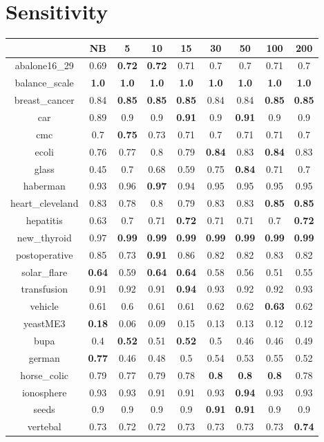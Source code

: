 \documentclass{article}%
\begin{document}
%
\section*{Sensitivity}%
\begin{tabular}{c|cccccccc}%
\hline%
&NB&5&10&15&30&50&100&200\\%
\hline%
abalone16\_29&0.69&\textbf{0.72}&\textbf{0.72}&0.71&0.7&0.7&0.71&0.7\\%
\hline%
balance\_scale&\textbf{1.0}&\textbf{1.0}&\textbf{1.0}&\textbf{1.0}&\textbf{1.0}&\textbf{1.0}&\textbf{1.0}&\textbf{1.0}\\%
\hline%
breast\_cancer&0.84&\textbf{0.85}&\textbf{0.85}&\textbf{0.85}&0.84&0.84&\textbf{0.85}&\textbf{0.85}\\%
\hline%
car&0.89&0.9&0.9&\textbf{0.91}&0.9&\textbf{0.91}&0.9&0.9\\%
\hline%
cmc&0.7&\textbf{0.75}&0.73&0.71&0.7&0.71&0.71&0.7\\%
\hline%
ecoli&0.76&0.77&0.8&0.79&\textbf{0.84}&0.83&\textbf{0.84}&0.83\\%
\hline%
glass&0.45&0.7&0.68&0.59&0.75&\textbf{0.84}&0.71&0.7\\%
\hline%
haberman&0.93&0.96&\textbf{0.97}&0.94&0.95&0.95&0.95&0.95\\%
\hline%
heart\_cleveland&0.83&0.78&0.8&0.79&0.83&0.83&\textbf{0.85}&\textbf{0.85}\\%
\hline%
hepatitis&0.63&0.7&0.71&\textbf{0.72}&0.71&0.71&0.7&\textbf{0.72}\\%
\hline%
new\_thyroid&0.97&\textbf{0.99}&\textbf{0.99}&\textbf{0.99}&\textbf{0.99}&\textbf{0.99}&\textbf{0.99}&\textbf{0.99}\\%
\hline%
postoperative&0.85&0.73&\textbf{0.91}&0.86&0.82&0.82&0.83&0.82\\%
\hline%
solar\_flare&\textbf{0.64}&0.59&\textbf{0.64}&\textbf{0.64}&0.58&0.56&0.51&0.55\\%
\hline%
transfusion&0.91&0.92&0.91&\textbf{0.94}&0.93&0.92&0.92&0.93\\%
\hline%
vehicle&0.61&0.6&0.61&0.61&0.62&0.62&\textbf{0.63}&0.62\\%
\hline%
yeastME3&\textbf{0.18}&0.06&0.09&0.15&0.13&0.13&0.12&0.12\\%
\hline%
bupa&0.4&\textbf{0.52}&0.51&\textbf{0.52}&0.5&0.46&0.46&0.49\\%
\hline%
german&\textbf{0.77}&0.46&0.48&0.5&0.54&0.53&0.55&0.52\\%
\hline%
horse\_colic&0.79&0.77&0.79&0.78&\textbf{0.8}&\textbf{0.8}&\textbf{0.8}&0.78\\%
\hline%
ionosphere&0.93&0.93&0.91&0.91&0.93&\textbf{0.94}&0.93&0.93\\%
\hline%
seeds&0.9&0.9&0.9&0.9&\textbf{0.91}&\textbf{0.91}&0.9&0.9\\%
\hline%
vertebal&0.73&0.72&0.72&0.73&0.73&0.73&0.73&\textbf{0.74}\\%
\hline%
\end{tabular}
\end{document}
